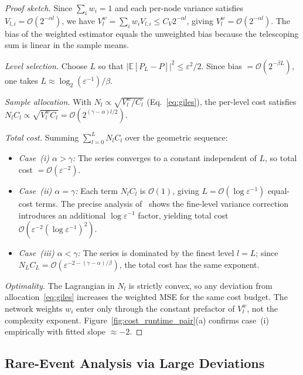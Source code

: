 \documentclass[pdflatex,sn-mathphys-num]{sn-jnl}
\theoremstyle{thmstyleone}%
\theoremstyle{thmstyletwo}%
\theoremstyle{thmstylethree}%
\begin{document}
\begin{proof}[Proof sketch]
Since $\sum_i w_i = 1$ and each per-node variance satisfies $V_{l,i} = \mathcal{O}(2^{-\alpha l})$,
we have $V_l^w = \sum_i w_i V_{l,i} \le C_V 2^{-\alpha l}$, giving $V_l^w = \mathcal{O}(2^{-\alpha l})$.
The bias of the weighted estimator equals the unweighted bias
because the telescoping sum is linear in the sample means.

\emph{Level selection.}  Choose $L$ so that $|\mathbb{E}[P_L - P]|^2 \le \varepsilon^2/2$.
Since bias $= \mathcal{O}(2^{-\beta L})$, one takes $L \approx \log_2(\varepsilon^{-1})/\beta$.

\emph{Sample allocation.}  With $N_l \propto \sqrt{V_l^w/C_l}$ (Eq.~\eqref{eq:giles}),
the per-level cost satisfies $N_l C_l \propto \sqrt{V_l^w C_l} = \mathcal{O}(2^{(\gamma-\alpha)l/2})$.

\emph{Total cost.}  Summing $\sum_{l=0}^{L} N_l C_l$ over the geometric sequence:
\begin{itemize}
  \item \emph{Case~(i) $\alpha > \gamma$:}  The series converges to a constant independent of
    $L$, so total cost $= \mathcal{O}(\varepsilon^{-2})$.
  \item \emph{Case~(ii) $\alpha = \gamma$:}  Each term $N_l C_l$ is $\mathcal{O}(1)$, giving
    $L = \mathcal{O}(\log\varepsilon^{-1})$ equal-cost terms.  The precise analysis
    of~\cite{giles2015multilevel} shows the fine-level variance correction introduces
    an additional $\log\varepsilon^{-1}$ factor, yielding total cost
    $\mathcal{O}(\varepsilon^{-2}(\log\varepsilon^{-1})^2)$.
  \item \emph{Case~(iii) $\alpha < \gamma$:}  The series is dominated by the finest level
    $l = L$; since $N_L C_L = \mathcal{O}(\varepsilon^{-2-(\gamma-\alpha)/\beta})$, the
    total cost has the same exponent.
\end{itemize}

\emph{Optimality.}  The Lagrangian in $N_l$ is strictly convex, so any deviation from
allocation~\eqref{eq:giles} increases the weighted MSE for the same cost budget.  The
network weights $w_i$ enter only through the constant prefactor of $V_l^w$, not the
complexity exponent.  Figure~\ref{fig:cost_runtime_pair}(a) confirms case~(i) empirically
with fitted slope $\approx{-2}$.
\end{proof}

\subsection{Rare-Event Analysis via Large Deviations}
\label{subsec:rare_event}
\end{document}
